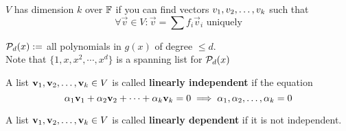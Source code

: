 \begin{definition}
    $V$ has dimension $k$ over $\mathbb F$ if you can find vectors ${v}_1,{v}_2, \ldots, {v}_{k}$ such that
    \[\forall \vec v \in V : \vec v = \sum f_i\vec v_i \text{ uniquely}\]
\end{definition}
\begin{definition}
    $\mathcal P_d(x) : =$ all polynomials in $g(x)$ of degree $\leq d$. \\ Note that $\{ 1, x, x^2, \cdots, x^d\}$ is a spanning list for $\mathcal P_d(x)$
\end{definition}
\begin{definition}
    A list ${\mathbf v}_1,{\mathbf v}_2, \ldots, {\mathbf v}_{k} \in V$ is called \textbf{linearly independent} if the equation
    \[ \alpha_1 \mathbf v_1 + \alpha_2 \mathbf v_2 + \cdots + \alpha_k \mathbf v_k = 0 \implies {\alpha}_1,{\alpha}_2, \ldots, {\alpha}_{k} = 0\]
\end{definition}
\begin{definition}
    A list ${\mathbf v}_1,{\mathbf v}_2, \ldots, {\mathbf v}_{k} \in V$ is called \textbf{linearly dependent} if it is not independent.
\end{definition}
